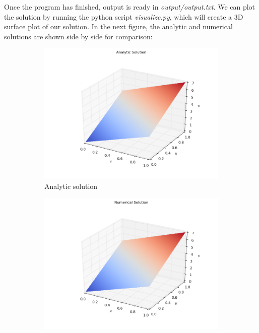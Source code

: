 \documentclass[11pt]{report}
\begin{document}
Once the program has finished, output is ready in \emph{output/output.txt}. We can plot the solution by running the python script \emph{visualize.py}, which will create a 3D surface plot of our solution. In the next figure, the analytic and numerical solutions are shown side by side for comparison:

\begin{figure}[h!]
\centering
\begin{subfigure}{0.5\textwidth}
  \centering
  \includegraphics[width=1.0\linewidth]{images/example1_analytic}
  \caption{Analytic solution}
  \label{fig:sub1}
\end{subfigure}%
\begin{subfigure}{0.5\textwidth}
  \centering
  \includegraphics[width=1.0\linewidth]{images/example1_numerical}

\end{subfigure}
\end{figure}
\end{document}
